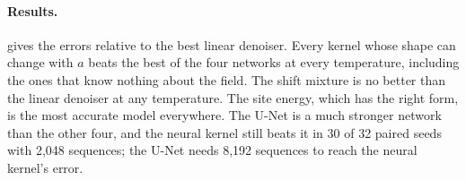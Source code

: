 \paragraph{Results.}  gives the errors relative to the best linear denoiser. Every kernel whose shape can
change with $a$ beats the best of the four networks at every temperature, including the ones that know nothing about
the field. The shift mixture is no better than the linear denoiser at any temperature. The site energy, which has the
right form, is the most accurate model everywhere. The U-Net is a much stronger network than the other four, and the
neural kernel still beats it in 30 of 32 paired seeds with 2{,}048 sequences; the U-Net needs 8{,}192 sequences to
reach the neural kernel's error.

\begin{table}[!htbp]
  \caption{Allen--Cahn field: relative score error divided by that of the best linear denoiser, from 2{,}048 training
  sequences; mean over 16 seeds (8 for the neural kernel and the U-Net). Best of four: a window CNN and a transformer,
  each trained in two ways on the same noisy sequences as EM. Dashes: not run.}
  \label{tab:field}
  \centering
  \small
  \setlength{\tabcolsep}{3.5pt}
  
\end{table}
